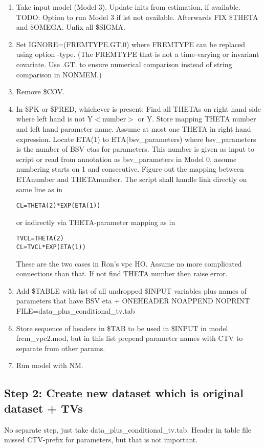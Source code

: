 \documentclass[a4paper,12pt]{article}
\begin{document}
\begin{enumerate}
	\item Take input model (Model 3). Update inits from estimation, if available. TODO: Option to run Model 3 if lst not available. Afterwards FIX \$THETA and \$OMEGA. Unfix all \$SIGMA.
	\item Set IGNORE=(FREMTYPE.GT.0) where FREMTYPE can be replaced using option -type.
(The FREMTYPE that is not a time-varying or invariant covariate. Use .GT. to ensure numerical comparison instead of string comparison in NONMEM.)
	\item Remove \$COV.
	\item In \$PK or \$PRED, whichever is present: 
Find all THETAs on right hand side where left hand is not Y$<$number$>$ or Y. Store mapping THETA number and left hand parameter name. Assume at most one THETA in right hand expression.  
Locate ETA(1) to ETA(bsv\_parameters) where bsv\_parameters is the number of BSV etas for parameters. This number is given as input to script or read from annotation as bsv\_parameters in Model 0, assume numbering starts on 1 and consecutive. Figure out the mapping between ETAnumber and THETAnumber. The script shall handle link directly on same line as in 
\begin{verbatim}
CL=THETA(2)*EXP(ETA(1))
\end{verbatim} 
or indirectly via THETA-parameter mapping as in 
\begin{verbatim}
TVCL=THETA(2)
CL=TVCL*EXP(ETA(1))
\end{verbatim}  
These are the two cases in Ron's vpc HO. Assume no more complicated connections than that. If not find THETA number then raise error.
	\item Add \$TABLE with list of all undropped \$INPUT variables plus names of parameters that have BSV eta  + ONEHEADER NOAPPEND NOPRINT FILE=data\_plus\_conditional\_tv.tab
	\item Store sequence of headers in \$TAB to be used in \$INPUT in model frem\_vpc2.mod, but in this list prepend parameter names with CTV to separate from other params.
	\item Run model with NM.
\end{enumerate}

\subsection{Step 2: Create new dataset which is original dataset + TVs}
No separate step, just take data\_plus\_conditional\_tv.tab. Header in table file missed CTV-prefix for parameters, but that is not important.
\end{document}

